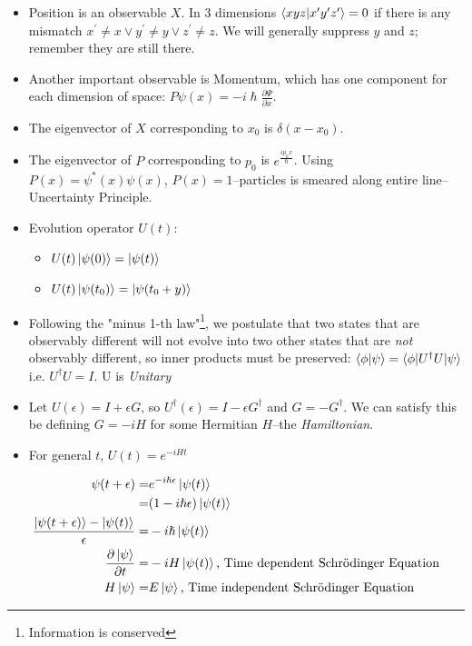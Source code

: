 \documentclass[]{article}
\begin{document}
\begin{itemize}
\begin{itemize}
		\item Position is an observable $X$. In 3 dimensions $\braket{xyz|x^{\prime}y^{\prime}z^{\prime}}=0$ if there is any mismatch $x^{\prime}\ne x \lor y^{\prime} \ne y \lor z^{\prime} \ne z$. We will generally suppress $y$ and $z$; remember they are still there.
		\item Another important observable is Momentum, which has one component for each dimension of space: $P\psi(x)=- i \hslash \frac{\partial \Psi}{\partial x}$.
		\item The eigenvector of $X$ corresponding to $x_0$ is $\delta(x-x_0)$.
		\item The eigenvector of $P$ corresponding to $p_0$ is $e^{\frac{i p_0 x}{\hslash}}$. Using $P(x)=\psi^*(x)\psi(x)$, $P(x)=1$--particles is smeared along entire line--Uncertainty Principle.
	\end{itemize}
\end{itemize}

\begin{itemize}
	\item Evolution operator $U(t)$:
	\begin{itemize}
		\item $U(t)\ket{\psi(0)} = \ket{\psi(t)}$
		\item $U(t)\ket{\psi(t_0)} = \ket{\psi(t_0 + y)}$
	\end{itemize}
	\item Following the "minus 1-th law"\footnote{Information is conserved}, we postulate that two states that are observably different will not evolve into two other states that are \emph{not} observably different, so inner products must be preserved: $\braket{\phi|\psi}=\braket{\phi|U^{\dagger}U|\psi}$ i.e. $U^{\dagger}U=I$. U is \emph{Unitary}
	\item Let $U(\epsilon)= I + \epsilon G$, so $U^\dagger(\epsilon)= I - \epsilon G^\dagger$ and $G=-G^{\dagger}$. We can satisfy this be defining $G=- i H$ for some Hermitian $H$--the \emph{Hamiltonian}.
	\item For general $t$, $U(t)=e^{- i H t}$
\end{itemize}
\begin{align*}
	\psi(t+\epsilon) =& e^{-i \hslash \epsilon} \ket{\psi(t)}\\
	=& (1- i \hslash \epsilon)\ket{\psi(t)}\\
	\frac{\ket{\psi(t+\epsilon)} -\ket{\psi(t)} }{\epsilon}=& -i \hslash \ket{\psi(t)}\\
	\frac{\partial \ket{\psi}}{\partial t} =& -i H \ket{\psi(t)} \text{, Time dependent Schr\"odinger Equation}\\
	H \ket{\psi} =& E \ket{\psi}\text{, Time independent Schr\"odinger Equation}
\end{align*} 
\end{document}
